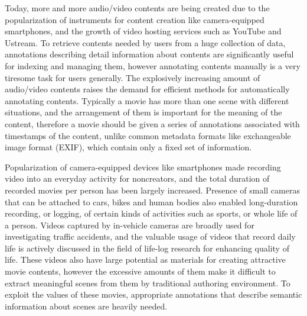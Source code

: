 Today, more and more audio/video contents are being created due to the popularization of instruments for content creation like camera-equipped smartphones, and the growth of video hosting services such as YouTube and Ustream.
To retrieve contents needed by users from a huge collection of data, annotations describing detail information about contents are significantly useful for indexing and managing them, however annotating contents manually is a very tiresome task for users generally.
The explosively increasing amount of audio/video contents raises the demand for efficient methods for automatically annotating contents.
Typically a movie has more than one scene with different situations, and the arrangement of them is important for the meaning of the content, therefore a movie should be given a series of annotations associated with timestamps of the content, unlike common metadata formats like exchangeable image format (EXIF), which contain only a fixed set of information.

Popularization of camera-equipped devices like smartphones made recording video into an everyday activity for noncreators, and the total duration of recorded movies per person has been largely increased.
Presence of small cameras that can be attached to cars, bikes and human bodies also enabled long-duration recording, or logging, of certain kinds of activities such as sports, or whole life of a person.
Videos captured by in-vehicle cameras are broadly used for investigating traffic accidents, and the valuable usage of videos that record daily life is actively discussed in the field of life-log research for enhancing quality of life.
These videos also have large potential as materials for creating attractive movie contents, however the excessive amounts of them make it difficult to extract meaningful scenes from them by traditional authoring environment.
To exploit the values of these movies, appropriate annotations that describe semantic information about scenes are heavily needed.

